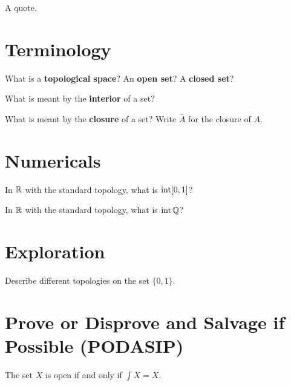 \documentclass{homework}
\author{Names of Contributors}
\begin{document}
\maketitle

\begin{inspiration}
  A quote. 
\end{inspiration}

\section{Terminology}

\begin{problem}
  What is a \textbf{topological space}?  An \textbf{open set}?  A \textbf{closed set}?
  \label{topological-space}
\end{problem}

\begin{problem}
  What is meant by the \textbf{interior} of a set?
\end{problem}

\begin{problem}
  What is meant by the \textbf{closure} of a set?  Write $\bar{A}$ for the closure of $A$.
\end{problem}

\section{Numericals}

\begin{problem}
  In $\mathbb{R}$ with the standard topology, what is
  $\operatorname{int} [0,1]$?
\end{problem}

\begin{problem}
  In $\mathbb{R}$ with the standard topology, what is
  $\operatorname{int} \mathbb{Q}$?
\end{problem}

\section{Exploration}

\begin{problem}
  Describe different topologies on the set $\{ 0, 1 \}$.
\end{problem}

\section{Prove or Disprove and Salvage if Possible (PODASIP)}

\begin{problem}
  The set $X$ is open if and only if $\int X = X$.
\end{problem}
\end{document}
